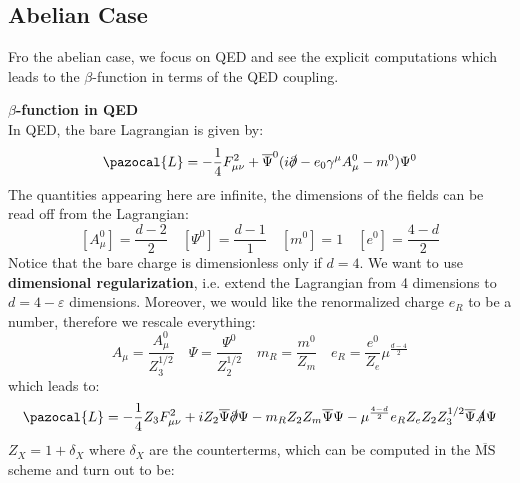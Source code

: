 \documentclass[../main.tex]{subfiles}
\begin{document}
\subsection{Abelian Case}
Fro the abelian case, we focus on QED and see the explicit computations which leads to the $\beta$-function in terms of the QED coupling.
\begin{example}\textbf{$\beta$-function in QED}\\
In QED, the bare Lagrangian is given by:
\[
\pazocal{L}=-\frac{1}{4}F^2_{\mu\nu}+\overline{\Psi}^0(i\slashed{\partial}-e_0\gamma^\mu A_\mu^0-m^0)\Psi^0
\]
The quantities appearing here are infinite, the dimensions of the fields can be read off from the Lagrangian:
\[
[A_\mu^0]=\frac{d-2}{2} \quad [\Psi^0]=\frac{d-1}{1} \quad [m^0]=1 \quad [e^0]=\frac{4-d}{2}
\]
Notice that the bare charge is dimensionless only if $d=4$. We want to use \textbf{dimensional regularization}, i.e. extend the Lagrangian from 4 dimensions to $d=4-\varepsilon$ dimensions. Moreover, we would like the renormalized charge $e_R$ to be a number, therefore we rescale everything:
\[
A_\mu=\frac{A_\mu^0}{Z_3^{1/2}} \quad \Psi=\frac{\Psi^0}{Z_2^{1/2}} \quad m_R=\frac{m^0}{Z_m} \quad e_R=\frac{e^0}{Z_e}\mu^{\frac{d-4}{2}}
\]
which leads to:
\[
\pazocal{L}=-\frac{1}{4}Z_3F_{\mu\nu}^2+iZ_2\overline{\Psi}\slashed{\partial}\Psi-m_RZ_2Z_m\overline{\Psi}\Psi-\mu^{\frac{4-d}{2}}e_RZ_eZ_2Z_3^{1/2}\overline{\Psi}\slashed{A}\Psi
\]
$Z_X=1+\delta_X$ where $\delta_X$ are the counterterms, which can be computed in the $\overline{\text{MS}}$ scheme and turn out to be:
\end{example}
\end{document}
